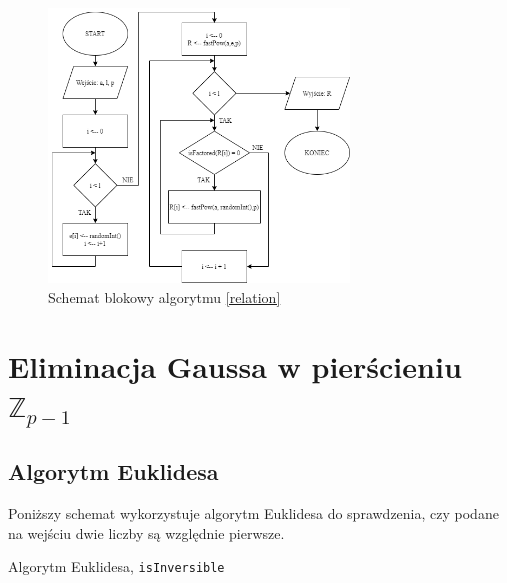 \documentclass[]{article}
\begin{document}
	\begin{figure}[H]
		\begin{center}
			\includegraphics[width=8cm]{alg 6.png} \caption{Schemat blokowy algorytmu \ref{relation}}
		\end{center}
	\end{figure}

\newpage
\section{Eliminacja Gaussa w pierścieniu \(\mathbb{Z}_{p-1}\)}
	\subsection{Algorytm Euklidesa}
		Poniższy schemat wykorzystuje algorytm Euklidesa do sprawdzenia, czy podane na wejściu dwie liczby są względnie pierwsze. \\
	\begin{algorithm}[H]
		\label{Euklid}
		\caption{Algorytm Euklidesa, \texttt{isInversible}}
		\BlankLine
		
	\end{algorithm}
\end{document}

